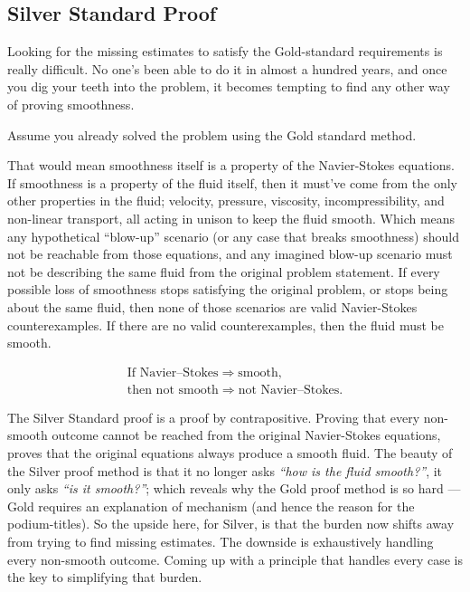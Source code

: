 \subsection{Silver Standard Proof}\label{sub:SilverStandardProof}

Looking for the missing estimates to satisfy the Gold-standard requirements is really difficult.
No one's been able to do it in almost a hundred years, and once you dig your teeth into the problem, it becomes tempting to find any other way of proving smoothness.

Assume you already solved the problem using the Gold standard method.

That would mean smoothness itself is a property of the Navier-Stokes equations.
If smoothness is a property of the fluid itself, then it must've come from the only other properties in the fluid; velocity, pressure, viscosity, incompressibility, and non-linear transport, all acting in unison to keep the fluid smooth.
Which means any hypothetical “blow-up” scenario (or any case that breaks smoothness) should not be reachable from those equations, and any imagined blow-up scenario must not be describing the same fluid from the original problem statement.
If every possible loss of smoothness stops satisfying the original problem, or stops being about the same fluid, then none of those scenarios are valid Navier-Stokes counterexamples.
If there are no valid counterexamples, then the fluid must be smooth.

\[
  \begin{gathered}
  \text{If Navier--Stokes}\Longrightarrow\text{smooth},
  \\
  \text{then not smooth}\Longrightarrow\text{not Navier--Stokes}.
  \end{gathered}
\]

The Silver Standard proof is a proof by contrapositive.
Proving that every non-smooth outcome cannot be reached from the original Navier-Stokes equations, proves that the original equations always produce a smooth fluid.
The beauty of the Silver proof method is that it no longer asks \textit{“how is the fluid smooth?”}, it only asks \textit{“is it smooth?”}; which reveals why the Gold proof method is so hard — Gold requires an explanation of mechanism (and hence the reason for the podium-titles).
So the upside here, for Silver, is that the burden now shifts away from trying to find missing estimates.
The downside is exhaustively handling every non-smooth outcome.
Coming up with a principle that handles every case is the key to simplifying that burden.
